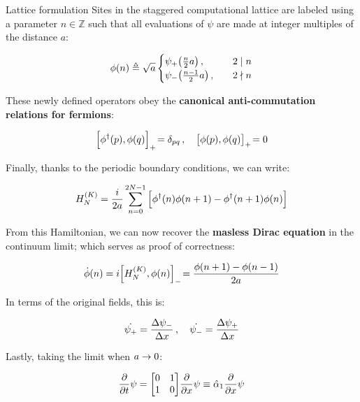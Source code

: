 \begin{frame}[allowframebreaks]{Lattice formulation}
	Sites in the staggered computational lattice are labeled using a parameter $n \in \mathds{Z}$ such that all evaluations of $\psi$ are made at integer multiples of the distance $a$:

	\begin{gather*}
	  \phi(n) \triangleq \sqrt{a}
	    \begin{cases}
	      \psi_{+}\qty(\frac{n}{2}a) \,,\quad &2 \mid n \\
	      \psi_{-}\qty(\frac{n-1}{2}a) \,,\quad &2 \nmid n
	    \end{cases}
	\end{gather*}

	These newly defined operators obey the \textbf{canonical anti-commutation relations for fermions}:

	\begin{gather*} \label{eq:fermion-canonical-commutation-relations}
	  \acom{\phi^{\dagger}(p)}{\phi(q)} = \delta_{pq} \qc
	  \acom{\phi(p)}{\phi(q)} = 0
	\end{gather*}

	Finally, thanks to the periodic boundary conditions, we can write:

	\begin{gather*}
	  H_{N}^{(K)} =
	    \frac{i}{2a} \sum_{n=0}^{2N-1} \qty[
	    \phi^{\dagger}(n)\phi(n+1) - \phi^{\dagger}(n+1)\phi(n)]
	\end{gather*}

\break

	From this Hamiltonian, we can now recover the \textbf{masless Dirac equation} in the continuum limit; which serves as proof of correctness:

	\begin{gather*}
	  \dot{\phi}(n) =
      i\com{H_{N}^{(K)}}{\phi(n)} =
      \frac{\phi(n+1)-\phi(n-1)}{2a}
	\end{gather*}

	In terms of the original fields, this is:

	\begin{gather*}
	  \dot{\psi_{+}} = \frac{\Delta \psi_{-}}{\Delta x} \,,\quad
	  \dot{\psi_{-}} = \frac{\Delta \psi_{+}}{\Delta x}
	\end{gather*}

	Lastly, taking the limit when $a \rightarrow 0$:

	\begin{gather*}
	  \pderivative{t}\psi =
      \mqty[0 & 1 \\ 1 & 0] \pderivative{x}\psi \equiv
      \hat{\alpha}_1 \pderivative{x}\psi
	\end{gather*}

\end{frame}

